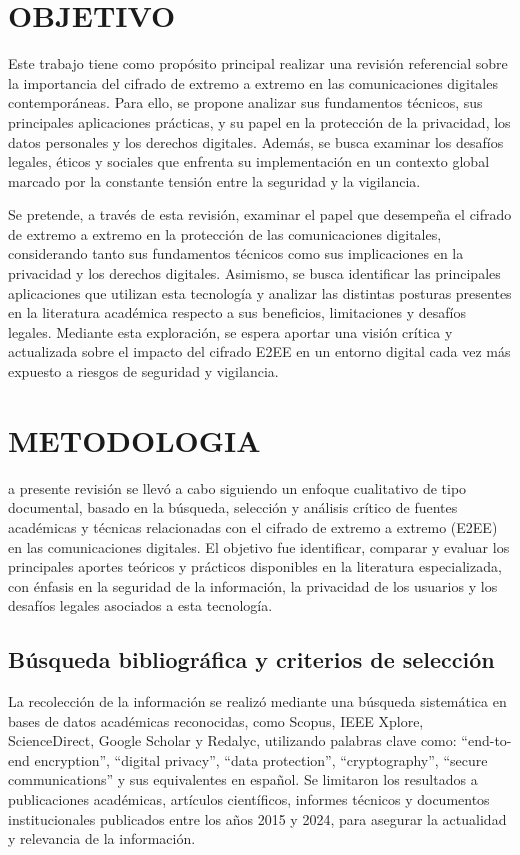\documentclass[spanish,12pt,a4paper]{article}
\begin{document}
\begin{multicols}{2}
		\section*{\normalsize OBJETIVO}
			
		Este trabajo tiene como propósito principal realizar una revisión referencial sobre la importancia del cifrado de extremo a extremo en las comunicaciones digitales contemporáneas. Para ello, se propone analizar sus fundamentos técnicos, sus principales aplicaciones prácticas, y su papel en la protección de la privacidad, los datos personales y los derechos digitales. Además, se busca examinar los desafíos legales, éticos y sociales que enfrenta su implementación en un contexto global marcado por la constante tensión entre la seguridad y la vigilancia.
		
		Se pretende, a través de esta revisión, examinar el papel que desempeña el cifrado de extremo a extremo en la protección de las comunicaciones digitales, considerando tanto sus fundamentos técnicos como sus implicaciones en la privacidad y los derechos digitales. Asimismo, se busca identificar las principales aplicaciones que utilizan esta tecnología y analizar las distintas posturas presentes en la literatura académica respecto a sus beneficios, limitaciones y desafíos legales. Mediante esta exploración, se espera aportar una visión crítica y actualizada sobre el impacto del cifrado E2EE en un entorno digital cada vez más expuesto a riesgos de seguridad y vigilancia.
		\section*{\normalsize METODOLOGIA}
		
		a presente revisión se llevó a cabo siguiendo un enfoque cualitativo de tipo documental, basado en la búsqueda, selección y análisis crítico de fuentes académicas y técnicas relacionadas con el cifrado de extremo a extremo (E2EE) en las comunicaciones digitales. El objetivo fue identificar, comparar y evaluar los principales aportes teóricos y prácticos disponibles en la literatura especializada, con énfasis en la seguridad de la información, la privacidad de los usuarios y los desafíos legales asociados a esta tecnología.
		
		\subsection*{\normalsize Búsqueda bibliográfica y criterios de selección }
		La recolección de la información se realizó mediante una búsqueda sistemática en bases de datos académicas reconocidas, como Scopus, IEEE Xplore, ScienceDirect, Google Scholar y Redalyc, utilizando palabras clave como: “end-to-end encryption”, “digital privacy”, “data protection”, “cryptography”, “secure communications” y sus equivalentes en español. Se limitaron los resultados a publicaciones académicas, artículos científicos, informes técnicos y documentos institucionales publicados entre los años 2015 y 2024, para asegurar la actualidad y relevancia de la información.
		

\end{multicols}
\end{document}
